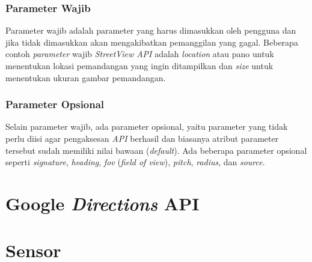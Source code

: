\subsubsection{Parameter Wajib}
Parameter wajib adalah parameter yang harus dimasukkan oleh pengguna dan jika tidak dimasukkan akan mengakibatkan pemanggilan yang gagal. 
Beberapa contoh {\it parameter} wajib {\it StreetView API} adalah {\it location} atau pano untuk menentukan lokasi pemandangan yang ingin ditampilkan dan {\it size} untuk menentukan ukuran gambar pemandangan. 

\subsubsection{Parameter Opsional}
Selain parameter wajib, ada parameter opsional, yaitu parameter yang tidak perlu diisi agar pengaksesan {\it API} berhasil dan biasanya atribut parameter tersebut sudah memiliki nilai bawaan ({\it default}). Ada beberapa parameter opsional seperti {\it signature}, {\it heading}, {\it fov} ({\it field of view}), {\it pitch}, {\it radius}, dan {\it source}. 

\section{Google {\it Directions} API}
\label{sec:directions}

\section{Sensor}
\label{sec:sensor}
 
